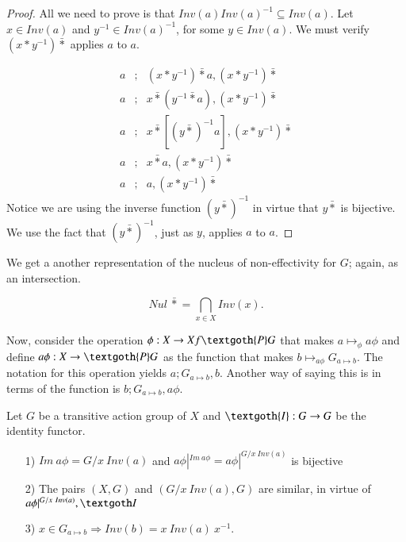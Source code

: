 \documentclass [12pt]{book}
\begin{document}
\begin{proof}All we need to prove is that $Inv(a)Inv(a)^{-1}\subseteq Inv(a)$. Let $x\in Inv(a)$ and $y^{-1}\in Inv(a)^{-1}$, for some $y\in Inv(a)$. We must verify $(x*y^{-1})\bar*$ applies $a$ to $a$. 

\begin{eqnarray}\nonumber a&;&(x*y^{-1})\bar*a,(x*y^{-1})\bar*\\\nonumber a&;&x\bar*(y^{-1}\bar*a),(x*y^{-1})\bar*\\\nonumber a&;&x\bar*[(y\bar*)^{-1}a],(x*y^{-1})\bar*\\\nonumber a&;&x\bar*a,(x*y^{-1})\bar*\\\nonumber a&;&a,(x*y^{-1})\bar*\end{eqnarray}Notice we are using the inverse function $(y\bar*)^{-1}$ in virtue that $y\bar*$ is bijective. We use the fact that $(y\bar*)^{-1}$, just as $y$, applies $a$ to $a$.\end{proof}

We get a another representation of the nucleus of non-effectivity for $G$; again, as an intersection.

$$Nul~\bar*=\bigcap_{x\in X}Inv(x).$$

Now, consider the operation $\phi:X\rightarrow Xf\textgoth{P}G$ that makes $a\mapsto_{\phi}a\phi$ and define $a\phi:X\rightarrow \textgoth{P}G$ as the function that makes $b\mapsto_{a\phi} G_{a\mapsto b}$. The notation for this operation yields $a;G_{a\mapsto b},b$. Another way of saying this is in terms of the function is $b;G_{a\mapsto b},a\phi$.

\begin{theorem}Let $G$ be a transitive action group of $X$ and $\textgoth{I}:G\rightarrow G$ be the identity functor.

	\begin{itemize}

\item[1)] $Im~a\phi=G/x~Inv(a)$ and $a\phi|^{Im~a\phi}=a\phi|^{G/x~Inv(a)}$ is bijective

\item[2)] The pairs $(X,G)$ and $(G/x~Inv(a),G)$ are similar, in virtue of $a\phi|^{G/x~Inv(a)},\textgoth I$

\item[3)]$x\in G_{a\mapsto b}\Rightarrow Inv(b)=x~Inv(a)~x^{-1}$.

	\end{itemize}

\end{theorem}
\end{document}
